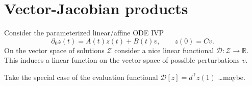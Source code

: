 \documentclass{article}
\begin{document}
\section{Vector-Jacobian products}
Consider the parameterized linear/affine ODE IVP
\begin{equation}
    \partial_0 z(t) = A(t) z(t) + B(t) v, \qquad z(0) = C v.
\end{equation}
On the vector space of solutions $\mathcal{Z}$ consider a nice linear
functional $\mathcal{D}: \mathcal{Z} \to \mathbb{R}$. This induces a linear
function on the vector space of possible perturbations $v$.

Take the special case of the evaluation functional $\mathcal{D}[z] =
d^\mathsf{T} z(1)$ \ldots maybe.
\end{document}
